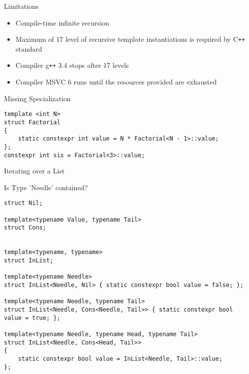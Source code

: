 \documentclass[aspectratio=169]{beamer}
\begin{document}

\begin{frame}[fragile]{Limitations}
    
    \begin{itemize}
        \item Compile-time infinite recursion
        \item Maximum of 17 level of recursive template instantiations is required by C\texttt{++} standard
        \item Compiler g\texttt{++} 3.4 stops after 17 levels 
        \item Compiler MSVC 6 runs until the resources provided are exhausted
    \end{itemize}

    \scriptsize
    
    \begin{block}{Missing Specialization}
        \begin{verbatim}
template <int N>
struct Factorial
{
    static constexpr int value = N * Factorial<N - 1>::value;
};
constexpr int six = Factorial<3>::value;
        \end{verbatim}
    \end{block}

\end{frame}


\begin{frame}[fragile]{Iterating over a List}
    \scriptsize
    \begin{block}{Is Type 'Needle' contained?}
        \begin{verbatim}
struct Nil;

template<typename Value, typename Tail>
struct Cons;


template<typename, typename>
struct InList;

template<typename Needle>
struct InList<Needle, Nil> { static constexpr bool value = false; };

template<typename Needle, typename Tail>
struct InList<Needle, Cons<Needle, Tail>> { static constexpr bool value = true; };

template<typename Needle, typename Head, typename Tail>
struct InList<Needle, Cons<Head, Tail>> 
{
    static constexpr bool value = InList<Needle, Tail>::value;
};
        \end{verbatim}
    \end{block}

\end{frame}
\end{document}
